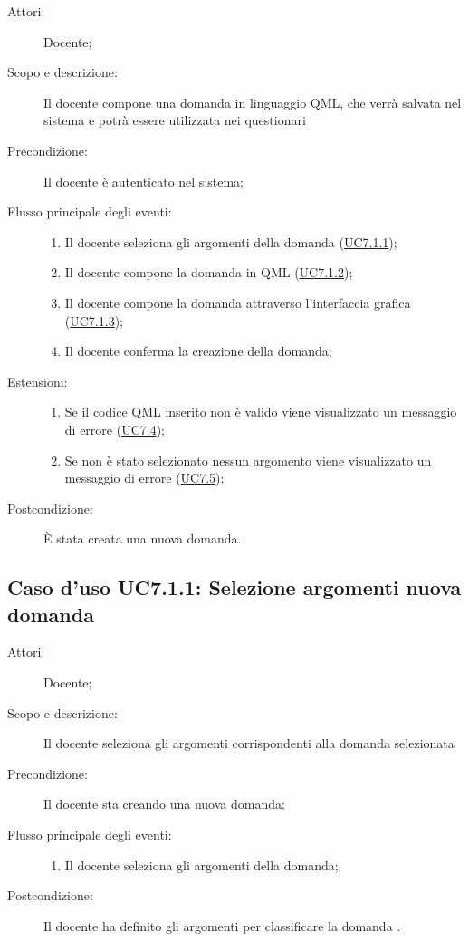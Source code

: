     \begin{description}
\item[Attori:] Docente;
\item[Scopo e descrizione:] Il docente compone una domanda in linguaggio QML, che verrà salvata nel sistema e potrà essere utilizzata nei questionari
      \item[Precondizione:] Il docente è autenticato nel sistema;

        \item[Flusso principale degli eventi:] \begin{enumerate}
          \item Il docente seleziona gli argomenti della domanda (\hyperlink{UC7.1.1}{UC7.1.1});
          \item Il docente compone la domanda in QML  (\hyperlink{UC7.1.2}{UC7.1.2});
          \item Il docente compone la domanda attraverso l'interfaccia grafica (\hyperlink{UC7.1.3}{UC7.1.3});
          \item Il docente conferma la creazione della domanda;

      \end{enumerate}
    \item[Estensioni:]
      \begin{enumerate}
          \item Se il codice QML inserito non è valido viene visualizzato un messaggio di errore (\hyperlink{UC7.4}{UC7.4});
          \item Se non è stato selezionato nessun argomento viene visualizzato un messaggio di errore (\hyperlink{UC7.5}{UC7.5});

      \end{enumerate}
    \item[Postcondizione:] È stata creata una nuova domanda.
  \end{description}
\hypertarget{UC7.1.1}{}
\subsection{Caso d'uso UC7.1.1: Selezione argomenti nuova domanda}\begin{description}
\item[Attori:] Docente;
\item[Scopo e descrizione:] Il docente seleziona gli argomenti corrispondenti alla domanda selezionata
      \item[Precondizione:] Il docente sta creando una nuova domanda;

        \item[Flusso principale degli eventi:] \begin{enumerate}
          \item Il docente seleziona gli argomenti della domanda;

      \end{enumerate}
    \item[Postcondizione:] Il docente ha definito gli argomenti per classificare la domanda
.
  \end{description}
\hypertarget{UC7.1.2}{}
